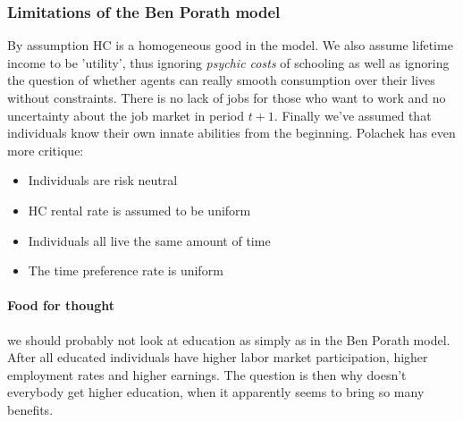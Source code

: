\documentclass[12pt, a4paper]{article}
\begin{document}
\begin{multicols}{2}
\subsubsection{Limitations of the Ben Porath model}
By assumption HC is a homogeneous good in the model. We also assume lifetime income to be 'utility', thus ignoring \textit{psychic costs} of schooling as well as ignoring the question of whether agents can really smooth consumption over their lives without constraints. There is no lack of jobs for those who want to work and no uncertainty about the job market in period $t+1$. Finally we've assumed that individuals know their own innate abilities from the beginning. Polachek has even more critique:
\begin{itemize}
\item Individuals are risk neutral
\item HC rental rate is assumed to be uniform
\item Individuals all live the same amount of time
\item The time preference rate is uniform
\end{itemize}

\paragraph{Food for thought} we should probably not look at education as simply as in the Ben Porath model. After all educated individuals have higher labor market participation, higher employment rates and higher earnings. The question is then why doesn't everybody get higher education, when it apparently seems to bring so many benefits.


\end{multicols}
\end{document}
